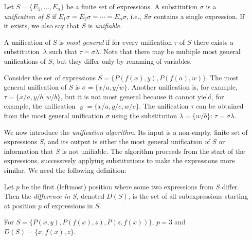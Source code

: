 \begin{definition}[Unification]
    Let $S=\{E_1,\dots,E_n\}$ be a finite set of expressions. A substitution $\sigma$ is a \emph{unification of $S$} if $E_1\sigma=E_2\sigma=\cdots =E_n\sigma$, i.e., $S\sigma$ contains a single expression. If it exists, we also say that $S$ is \emph{unifiable}. 
    
    A unification of $S$ is \emph{most general} if for every unification $\tau$ of $S$ there exists a substitution~$\lambda$ such that $\tau=\sigma\lambda$. Note that there may be multiple most general unifications of $S$, but they differ only by renaming of variables.
\end{definition}

\begin{example}
   Consider the set of expressions $S=\{P(f(x),y),P(f(a),w)\}$. The most general unification of $S$ is $\sigma=\{x/a,y/w\}$. Another unification is, for example, $\tau=\{x/a,y/b,w/b\}$, but it is not most general because it cannot yield, for example, the unification $\varrho=\{x/a, y/c, w/c\}$. The unification $\tau$ can be obtained from the most general unification $\sigma$ using the substitution $\lambda=\{w/b\}$: $\tau=\sigma\lambda$.
\end{example}

We now introduce the \emph{unification algorithm}. Its input is a non-empty, finite set of expressions $S$, and its output is either the most general unification of $S$ or information that $S$ is not unifiable. The algorithm proceeds from the start of the expressions, successively applying substitutions to make the expressions more similar. We need the following definition:

Let $p$ be the first (leftmost) position where some two expressions from $S$ differ. Then the \emph{difference in $S$}, denoted $D(S)$, is the set of all subexpressions starting at position $p$ of expressions in $S$.

\begin{example}
For $S=\{P(x,y),P(f(x),z),P(z,f(x))\}$, $p=3$ and $D(S)=\{x,f(x),z\}$.  
\end{example}

